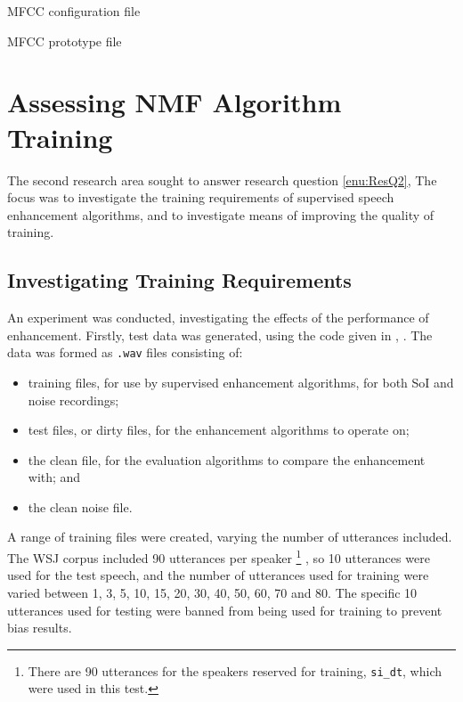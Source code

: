 \begin{listing}[H]
\protect\caption{\acs{MFCC} configuration file\label{lst:MFC-config}}



\end{listing}


\begin{listing}[H]
\protect\caption{\acs{MFCC} prototype file\label{lst:MFC-proto}}



\end{listing}



\section{Assessing \acl{NMF} Algorithm Training}

The second research area sought to answer research question \ref{enu:ResQ2},
\textit{\RQtwo{}} The focus was to investigate the training requirements
of supervised speech enhancement algorithms, and to investigate means
of improving the quality of training.


\subsection{\label{sub:Investigating-Training-Req}Investigating Training Requirements}

An experiment was conducted, investigating the effects of the performance
of enhancement. Firstly, test data was generated, using the code given
in , \textit{}.
The data was formed as \lstinline[language=bash]!.wav! files consisting
of:
\begin{itemize}
\item training files, for use by supervised enhancement algorithms, for
both \ac{SoI} and noise recordings;
\item test files, or dirty files, for the enhancement algorithms to operate
on;
\item the clean file, for the evaluation algorithms to compare the enhancement
with; and
\item the clean noise file.
\end{itemize}
A range of training files were created, varying the number of utterances
included. The \ac{WSJ} corpus included 90 utterances per speaker%
\footnote{There are 90 utterances for the speakers reserved for training, \lstinline[language=bash]!si_dt!,
which were used in this test.%
} \citep{Fransen1994}, so 10 utterances were used for the test speech,
and the number of utterances used for training were varied between
1, 3, 5, 10, 15, 20, 30, 40, 50, 60, 70 and 80. The specific 10 utterances
used for testing were banned from being used for training to prevent
bias results.

